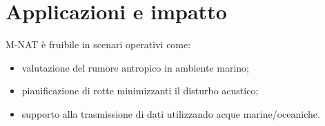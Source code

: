 \section{Applicazioni e impatto}

M-NAT è fruibile in scenari operativi come:
\begin{itemize}
  \item valutazione del rumore antropico in ambiente marino;
  \item pianificazione di rotte minimizzanti il disturbo acustico;
  \item supporto alla trasmissione di dati utilizzando acque marine/oceaniche.
\end{itemize}

